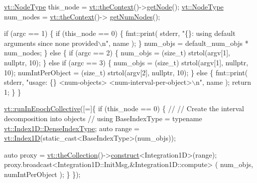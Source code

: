 \begin{DoxyCodeInclude}
  \hyperlink{namespacevt_a866da9d0efc19c0a1ce79e9e492f47e2}{vt::NodeType} this\_node = \hyperlink{namespacevt_a26551fe0e6e6a1371111df5b12c7e92c}{vt::theContext}()->\hyperlink{structvt_1_1ctx_1_1_context_a0d52c263ce8516546a67443d9a86fa5f}{getNode}();
  \hyperlink{namespacevt_a866da9d0efc19c0a1ce79e9e492f47e2}{vt::NodeType} num\_nodes = \hyperlink{namespacevt_a26551fe0e6e6a1371111df5b12c7e92c}{vt::theContext}()->
      \hyperlink{structvt_1_1ctx_1_1_context_a7f41071aadf6d5fa9e1b6c703c5ff19d}{getNumNodes}();

  \textcolor{keywordflow}{if} (argc == 1) \{
    \textcolor{keywordflow}{if} (this\_node == 0) \{
      fmt::print(
        stderr, \textcolor{stringliteral}{"\{\}: using default arguments since none provided\(\backslash\)n"}, name
      );
    \}
    num\_objs = default\_num\_objs * num\_nodes;
  \} \textcolor{keywordflow}{else} \{
    \textcolor{keywordflow}{if} (argc == 2) \{
      num\_objs = (size\_t) strtol(argv[1], \textcolor{keyword}{nullptr}, 10);
    \}
    \textcolor{keywordflow}{else} \textcolor{keywordflow}{if} (argc == 3) \{
      num\_objs = (size\_t) strtol(argv[1], \textcolor{keyword}{nullptr}, 10);
      numIntPerObject = (size\_t) strtol(argv[2], \textcolor{keyword}{nullptr}, 10);
    \}
    \textcolor{keywordflow}{else} \{
      fmt::print(
        stderr,
        \textcolor{stringliteral}{"usage: \{\} <num-objects> <num-interval-per-object>\(\backslash\)n"}, name
      );
      \textcolor{keywordflow}{return} 1;
    \}
  \}

  \hyperlink{namespacevt_a2fc4ef34f30b49a1781d765804bfadbb}{vt::runInEpochCollective}([=]\{
      \textcolor{keywordflow}{if} (this\_node == 0) \{
        \textcolor{comment}{//}
        \textcolor{comment}{// Create the interval decomposition into objects}
        \textcolor{comment}{//}
        \textcolor{keyword}{using} BaseIndexType = \textcolor{keyword}{typename} \hyperlink{structvt_1_1index_1_1_dense_index_array_a36698427e28045290d1fb072573275ec}{vt::Index1D::DenseIndexType};
        \textcolor{keyword}{auto} range = \hyperlink{namespacevt_a5540efc78234273e1796fb003fe4d234}{vt::Index1D}(static\_cast<BaseIndexType>(num\_objs));

        \textcolor{keyword}{auto} proxy = \hyperlink{namespacevt_a1c45ce63bfd2c327ff7d76a319a371d8}{vt::theCollection}()->\hyperlink{structvt_1_1vrt_1_1collection_1_1_collection_manager_a4de84e9efd7a3948e3c20be549441cfd}{construct}<Integration1D>(range);
        proxy.broadcast<Integration1D::InitMsg,&Integration1D::compute>
          (
           num\_objs, numIntPerObject
          );
      \}
    \});


\end{DoxyCodeInclude}
